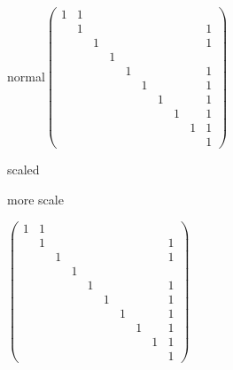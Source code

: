\documentclass{article}
\begin{document}
normal$\left( 
\begin{array}{cccccccccc}
1 & 1 &  &  &  &  &  &  &  &  \\ 
& 1 &  &  &  &  &  &  &  & 1 \\ 
&  & 1 &  &  &  &  &  &  & 1 \\ 
&  &  & 1 &  &  &  &  &  &  \\ 
&  &  &  & 1 &  &  &  &  & 1 \\ 
&  &  &  &  & 1 &  &  &  & 1 \\ 
&  &  &  &  &  & 1 &  &  & 1 \\ 
&  &  &  &  &  &  & 1 &  & 1 \\ 
&  &  &  &  &  &  &  & 1 & 1 \\ 
&  &  &  &  &  &  &  &  & 1%
\end{array}%
\right) $

scaled 

more scale

$\left( 
\begin{array}{cccccccccc}
1 & 1 &  &  &  &  &  &  &  &  \\ 
& 1 &  &  &  &  &  &  &  & 1 \\ 
&  & 1 &  &  &  &  &  &  & 1 \\ 
&  &  & 1 &  &  &  &  &  &  \\ 
&  &  &  & 1 &  &  &  &  & 1 \\ 
&  &  &  &  & 1 &  &  &  & 1 \\ 
&  &  &  &  &  & 1 &  &  & 1 \\ 
&  &  &  &  &  &  & 1 &  & 1 \\ 
&  &  &  &  &  &  &  & 1 & 1 \\ 
&  &  &  &  &  &  &  &  & 1%
\end{array}%
\right) $
\end{document}
